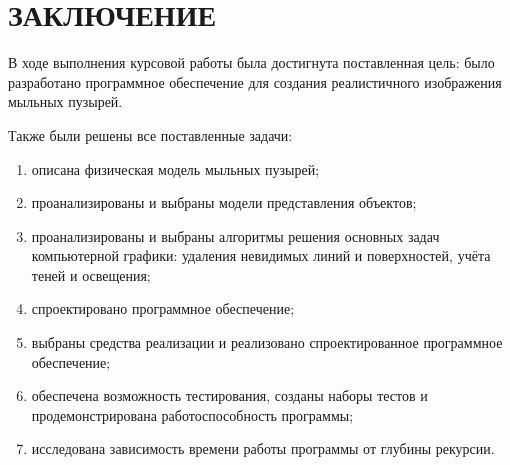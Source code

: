 \chapter*{ЗАКЛЮЧЕНИЕ}

В ходе выполнения курсовой работы была достигнута поставленная цель: было разработано программное обеспечение для создания реалистичного изображения мыльных пузырей.

Также были решены все поставленные задачи:
\begin{enumerate}[label=\arabic*)]
    \item описана физическая модель мыльных пузырей;
    \item проанализированы и выбраны модели представления объектов;
    \item проанализированы и выбраны алгоритмы решения основных задач компьютерной графики: удаления невидимых линий и поверхностей, учёта теней и освещения;
    \item спроектировано программное обеспечение;
    \item выбраны средства реализации и реализовано спроектированное программное обеспечение;
    \item обеспечена возможность тестирования, созданы наборы тестов и продемонстрирована работоспособность программы;
    \item исследована зависимость времени работы программы от глубины рекурсии.
\end{enumerate}
